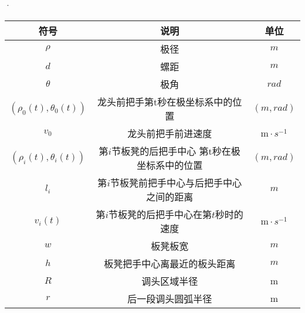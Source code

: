 \documentclass[../main.tex]{subfiles}
\begin{document}



\begin{table}[H]
    \centering·
    \renewcommand{\arrayrulewidth}{2.0pt}
    \begin{tabular}{ccc}
   \hline
    符号 & 说明 & 单位  \\ 
    \hline
    $\rho$                 & 极径                     & $m$                      \\
    $d$                   & 螺距                      &   $m$                    \\
    $\theta $                    & 极角                     & $rad$                      \\
 \((\rho _0(t),\theta _0(t))\)       & 龙头前把手第t秒在极坐标系中的位置                   & $(m,rad) $                     \\
    \(v_0\)                      & 龙头前把手前进速度                     & $\mathrm{m}\cdot s^{-1} $              \\
\((\rho _{i}(t),\theta _{i}(t))\)                   & 第\(i\)节板凳的后把手中心 第t秒在极坐标系中的位置                     & $(m,rad) $                      \\
$l_i$             &   第$i$节板凳前把手中心与后把手中心之间的距离                   & $m$                      \\
  \(v_i(t)\)                     & 第\(i\)节板凳的后把手中心在第\(t\)秒时的速度                     &  $\mathrm{m}\cdot s^{-1} $                    \\
   $w$                      & 板凳板宽                     & $m$                      \\
    $h$                   & 板凳把手中心离最近的板头距离                     & $m$                       \\
  $R$                     & 调头区域半径                     & m                      \\
    $r$                      & 后一段调头圆弧半径                      & m                       \\
   \hline
    \end{tabular}
    \end{table}
\end{document}
